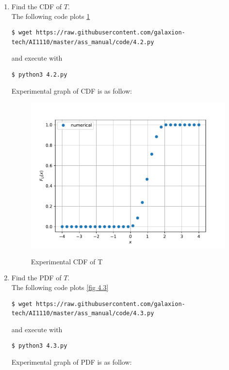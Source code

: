 \documentclass[journal,12pt,twocolumn]{IEEEtran}
\renewcommand\thesection{\arabic{section}}
\begin{document}
\begin{enumerate}[label=\thesection.\arabic*.,ref=\thesection.\theenumi]
    \item Find the CDF of $T$.\\
    \solution 
    The following code plots \ref{fig 4.2}
    \begin{lstlisting}
$ wget https://raw.githubusercontent.com/galaxion-tech/AI1110/master/ass_manual/code/4.2.py
    \end{lstlisting}
    and execute with
    \begin{lstlisting}
$ python3 4.2.py
    \end{lstlisting}
    Experimental graph of CDF is as follow:
    \begin{figure}[H]
        \includegraphics[scale=0.6]{./figs/4.2}
        \label{fig 4.2}
        \caption{Experimental CDF of T}
    \end{figure}
    \item Find the PDF of $T$.\\
    \solution 
    The following code plots \ref{fig 4.3}
    \begin{lstlisting}
$ wget https://raw.githubusercontent.com/galaxion-tech/AI1110/master/ass_manual/code/4.3.py    
    \end{lstlisting}
    and execute with
    \begin{lstlisting}
$ python3 4.3.py 
    \end{lstlisting}
    Experimental graph of PDF is as follow:
    \begin{figure}[H]

\end{figure}
\end{enumerate}
\end{document}
